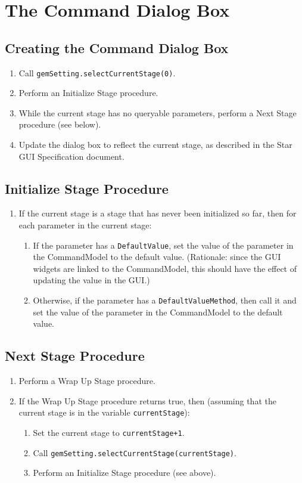 \documentclass[11pt]{article}
\begin{document}
\section{The Command Dialog Box}

\subsection{Creating the Command Dialog Box}

\begin{enumerate}
\item Call {\tt gemSetting.selectCurrentStage(0)}.
\item Perform an Initialize Stage procedure.
\item While the current stage has no queryable parameters, perform
  a Next Stage procedure (see below).
\item Update the dialog box to reflect the current stage, as described
  in the Star GUI Specification document.
\end{enumerate}

\subsection{Initialize Stage Procedure}

\begin{enumerate}
\item If the current stage is a stage that has never been initialized so far,
  then for each parameter in the current stage:
  \begin{enumerate}
  \item If the parameter has a {\tt DefaultValue}, set the value of the
    parameter in the CommandModel to the default value.
    (Rationale:  since the GUI widgets are linked to the CommandModel,
    this should have the effect of updating the value in the GUI.)
  \item Otherwise, if the parameter has a {\tt DefaultValueMethod}, then call it
    and set the value of the parameter in the CommandModel to the default
    value.
  \end{enumerate}
\end{enumerate}

\subsection{Next Stage Procedure}

\begin{enumerate}
\item Perform a Wrap Up Stage procedure.
\item If the Wrap Up Stage procedure returns true, then (assuming
  that the current stage is in the variable {\tt currentStage}):
  \begin{enumerate}
  \item Set the current stage to \verb/currentStage+1/.
  \item Call {\tt gemSetting.selectCurrentStage(currentStage)}.
  \item Perform an Initialize Stage procedure (see above).
  \end{enumerate}
\end{enumerate}
\end{document}
